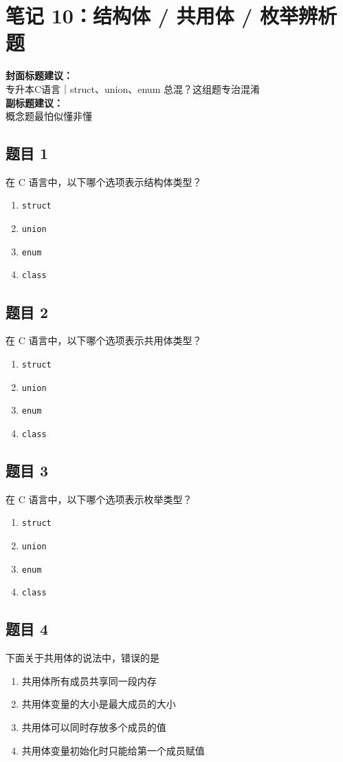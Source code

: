 \documentclass[12pt,a4paper]{ctexart}
\begin{document}
\newpage

\section{笔记 10：结构体 / 共用体 / 枚举辨析题}
\begin{coverbox}
\textbf{封面标题建议：}\\
专升本C语言｜struct、union、enum 总混？这组题专治混淆\\
\textbf{副标题建议：}\\
概念题最怕似懂非懂
\end{coverbox}

\subsection*{题目 1}
在 C 语言中，以下哪个选项表示结构体类型？
\begin{enumerate}[label=\Alph*.]
    \item \texttt{struct}
    \item \texttt{union}
    \item \texttt{enum}
    \item \texttt{class}
\end{enumerate}

\subsection*{题目 2}
在 C 语言中，以下哪个选项表示共用体类型？
\begin{enumerate}[label=\Alph*.]
    \item \texttt{struct}
    \item \texttt{union}
    \item \texttt{enum}
    \item \texttt{class}
\end{enumerate}

\subsection*{题目 3}
在 C 语言中，以下哪个选项表示枚举类型？
\begin{enumerate}[label=\Alph*.]
    \item \texttt{struct}
    \item \texttt{union}
    \item \texttt{enum}
    \item \texttt{class}
\end{enumerate}

\subsection*{题目 4}
下面关于共用体的说法中，错误的是
\begin{enumerate}[label=\Alph*.]
    \item 共用体所有成员共享同一段内存
    \item 共用体变量的大小是最大成员的大小
    \item 共用体可以同时存放多个成员的值
    \item 共用体变量初始化时只能给第一个成员赋值
\end{enumerate}
\end{document}
